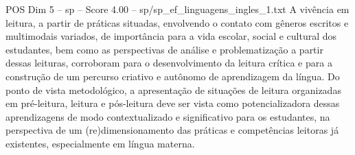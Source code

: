 \begin{textsample}{POS Dim 5 – sp – Score 4.00 – sp/sp\_ef\_linguagens\_ingles\_1.txt}
A vivência em leitura, a partir de práticas situadas, envolvendo o contato com gêneros escritos e multimodais variados, de importância para a vida escolar, social e cultural dos estudantes, bem como as perspectivas de análise e problematização a partir dessas leituras, corroboram para o desenvolvimento da leitura crítica e para a construção de um percurso criativo e autônomo de aprendizagem da língua.
Do ponto de vista metodológico, a apresentação de situações de leitura organizadas em pré-leitura, leitura e pós-leitura deve ser vista como potencializadora dessas aprendizagens de modo contextualizado e significativo para os estudantes, na perspectiva de um (re)dimensionamento das práticas e competências leitoras já existentes, especialmente em língua materna.

\end{textsample}
